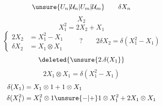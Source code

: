 \[\unsure{U_n|\mathcal U_n|U_m|\mathcal U_m}\qquad\delta X_n\]
\[X_2\]
\[X_1^2=2X_2+X_1\]
\[
\left\{\begin{aligned}
2X_2&=X_1^2-X_1\\
\delta X_2&=X_1\otimes X_1
\end{aligned}\right.
\qquad ?\qquad 2\delta X_2=\delta(X_1^2-X_1)
\]
\[\deleted{\unsure{2.\delta(X_1}}\]
\[2X_1\otimes X_1=\delta(X_1^2-X_1)\]
\[
\begin{aligned}
\delta(X_1)&=X_1\otimes1+1\otimes X_1\\
\delta(X_1^2)&=X_1^2\otimes1\unsure{-|+}1\otimes X_1^2+2X_1\otimes X_1
\end{aligned}
\]
